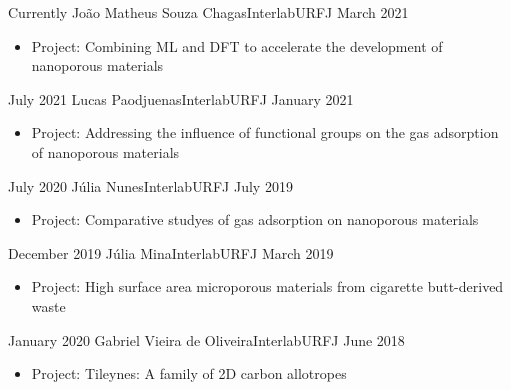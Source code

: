%
%
%


\begin{experiences}
   \experience
	{Currently}   {João Matheus Souza Chagas}{Interlab}{URFJ}
	{March 2021} {
		\begin{itemize}
			\item Project: Combining ML and DFT to accelerate the development of nanoporous materials
		\end{itemize}
	}{}
	\emptySeparator
   \experience
	{July 2021}   {Lucas Paodjuenas}{Interlab}{URFJ}
	{January 2021} {
		\begin{itemize}
			\item Project: Addressing the influence of functional groups on the gas adsorption of nanoporous materials
		\end{itemize}
	}{}
	\emptySeparator
   \experience
	{July 2020}   {Júlia Nunes}{Interlab}{URFJ}
	{July 2019} {
		\begin{itemize}
			\item Project: Comparative studyes of gas adsorption on nanoporous materials
		\end{itemize}
	}{}
	\emptySeparator
  \experience
	{December 2019}   {Júlia Mina}{Interlab}{URFJ}
	{March 2019} {
		\begin{itemize}
			\item Project: High surface area microporous materials from cigarette butt-derived waste
		\end{itemize}
	}{}
  \emptySeparator
  \experience
    {January 2020}   {Gabriel Vieira de Oliveira}{Interlab}{URFJ}
    {June 2018} {
                      \begin{itemize}
                        \item Project: Tileynes: A family of 2D carbon allotropes
                      \end{itemize}
                    }{}
\end{experiences}